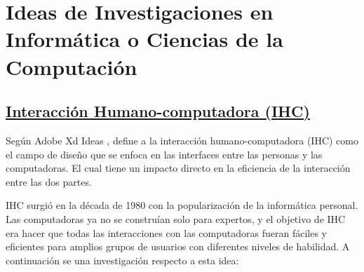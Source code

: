 \documentclass[10pt,journal]{IEEEtran}
\begin{document}
    \section{\textbf{Ideas de Investigaciones en Informática o Ciencias de la Computación}}
    \subsection{\underline{\textbf{Interacción Humano-computadora (IHC)}}}
    Según Adobe Xd Ideas \citep{HumanCom81}, define a la interacción humano-computadora (IHC) como el campo de diseño que se enfoca en las interfaces entre las personas y las computadoras. El cual tiene un impacto directo en la eficiencia de la interacción entre las dos partes.
    
    IHC surgió en la década de 1980 con la popularización de la informática personal. Las computadoras ya no se construían solo para expertos, y el objetivo de IHC era hacer que todas las interacciones con las computadoras fueran fáciles y eficientes para amplios grupos de usuarios con diferentes niveles de habilidad. A continuación se una investigación respecto a esta idea:
\end{document}
